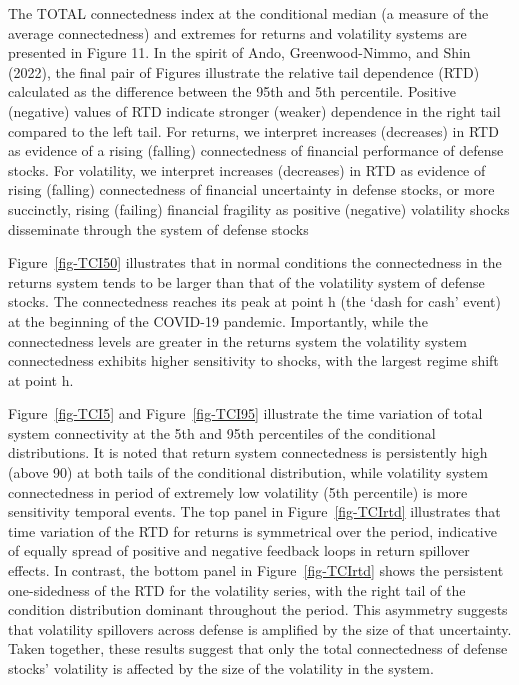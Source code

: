 \documentclass[
  number]{elsarticle}
\begin{document}
The TOTAL connectedness index at the conditional median (a measure of
the average connectedness) and extremes for returns and volatility
systems are presented in Figure 11. In the spirit of Ando,
Greenwood-Nimmo, and Shin (2022), the final pair of Figures illustrate
the relative tail dependence (RTD) calculated as the difference between
the 95th and 5th percentile. Positive (negative) values of RTD indicate
stronger (weaker) dependence in the right tail compared to the left
tail. For returns, we interpret increases (decreases) in RTD as evidence
of a rising (falling) connectedness of financial performance of defense
stocks. For volatility, we interpret increases (decreases) in RTD as
evidence of rising (falling) connectedness of financial uncertainty in
defense stocks, or more succinctly, rising (failing) financial fragility
as positive (negative) volatility shocks disseminate through the system
of defense stocks

Figure~\ref{fig-TCI50} illustrates that in normal conditions the
connectedness in the returns system tends to be larger than that of the
volatility system of defense stocks. The connectedness reaches its peak
at point h (the `dash for cash' event) at the beginning of the COVID-19
pandemic. Importantly, while the connectedness levels are greater in the
returns system the volatility system connectedness exhibits higher
sensitivity to shocks, with the largest regime shift at point h.

Figure~\ref{fig-TCI5} and Figure~\ref{fig-TCI95} illustrate the time
variation of total system connectivity at the 5th and 95th percentiles
of the conditional distributions. It is noted that return system
connectedness is persistently high (above 90) at both tails of the
conditional distribution, while volatility system connectedness in
period of extremely low volatility (5th percentile) is more sensitivity
temporal events. The top panel in Figure~\ref{fig-TCIrtd} illustrates
that time variation of the RTD for returns is symmetrical over the
period, indicative of equally spread of positive and negative feedback
loops in return spillover effects. In contrast, the bottom panel in
Figure~\ref{fig-TCIrtd} shows the persistent one-sidedness of the RTD
for the volatility series, with the right tail of the condition
distribution dominant throughout the period. This asymmetry suggests
that volatility spillovers across defense is amplified by the size of
that uncertainty. Taken together, these results suggest that only the
total connectedness of defense stocks' volatility is affected by the
size of the volatility in the system.
\end{document}
